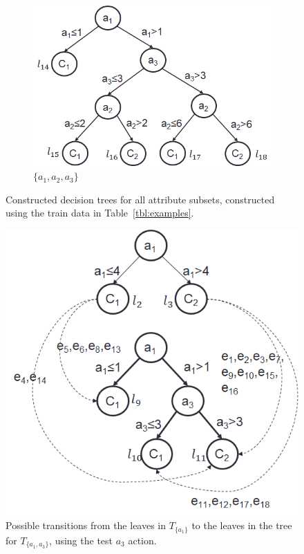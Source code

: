 \documentclass[letterpaper]{article}
\theoremstyle{definition}
\begin{document}
\begin{figure}[!t]
	\vspace{5mm}
    \hspace{-20mm}
	\begin{subfigure}[t]{1in}\vskip 0pt
		\centering
		\caption{$\{a_1,a_2,a_3\}$}\label{fig:a1a2a3}
		\includegraphics[scale=0.3]{a1a2a3}
	\end{subfigure}
	\caption{Constructed decision trees for all attribute subsets, constructed using the train data in Table~\ref{tbl:examples}.}\label{fig:Trees}
\end{figure}


\begin{figure}[ht]
\centering
\includegraphics[scale=0.5]{Transition2}
\caption{Possible transitions from the leaves in $T_{\{a_1\}}$ to the leaves in the tree for $T_{\{a_1,a_3\}}$, using the test $a_3$ action.}
\label{fig:transition}
\end{figure}
\end{document}
